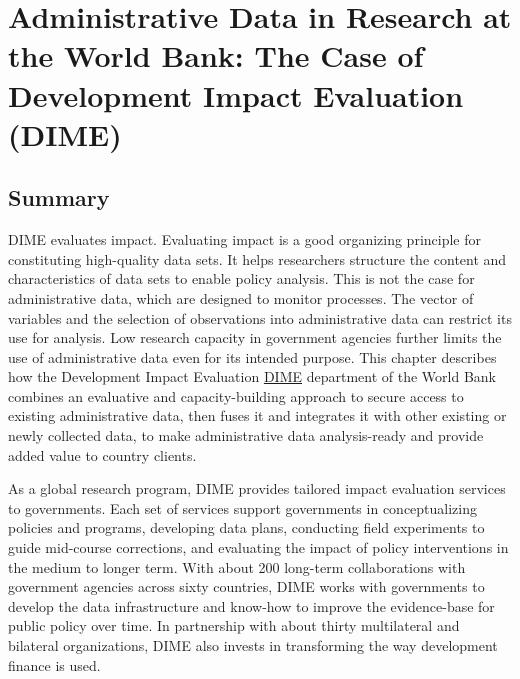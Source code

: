 
\hypertarget{dime}{%
\chapter{Administrative Data in Research at the World Bank: The Case of Development Impact Evaluation (DIME)}\label{dime}}

\hrulefill

\hypertarget{summary-7}{%
\section{Summary}\label{summary-7}}

DIME evaluates impact. Evaluating impact is a good organizing principle for constituting high-quality data sets. It helps researchers structure the content and characteristics of data sets to enable policy analysis. This is not the case for administrative data, which are designed to monitor processes. The vector of variables and the selection of observations into administrative data can restrict its use for analysis. Low research capacity in government agencies further limits the use of administrative data even for its intended purpose. This chapter describes how the Development Impact Evaluation \href{https://www.worldbank.org/en/research/dime}{DIME} department of the World Bank combines an evaluative and capacity-building approach to secure access to existing administrative data, then fuses it and integrates it with other existing or newly collected data, to make administrative data analysis-ready and provide added value to country clients.

As a global research program, DIME provides tailored impact evaluation services to governments. Each set of services support governments in conceptualizing policies and programs, developing data plans, conducting field experiments to guide mid-course corrections, and evaluating the impact of policy interventions in the medium to longer term. With about 200 long-term collaborations with government agencies across sixty countries, DIME works with governments to develop the data infrastructure and know-how to improve the evidence-base for public policy over time. In partnership with about thirty multilateral and bilateral organizations, DIME also invests in transforming the way development finance is used.

